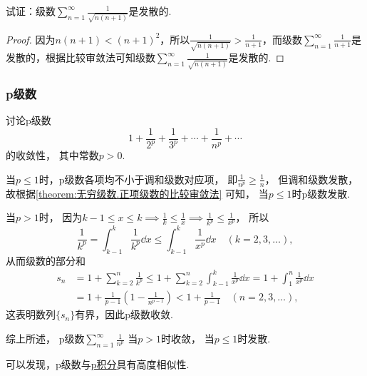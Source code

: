 \begin{example}
试证：级数\(\sum\limits_{n=1}^\infty \frac{1}{\sqrt{n(n+1)}}\)是发散的.
\begin{proof}
因为\(n(n+1) < (n+1)^2\)，所以\(\frac{1}{\sqrt{n(n+1)}} > \frac{1}{n+1}\)，而级数\(\sum\limits_{n=1}^\infty \frac{1}{n+1}\)是发散的，根据比较审敛法可知级数\(\sum\limits_{n=1}^\infty \frac{1}{\sqrt{n(n+1)}}\)是发散的.
\end{proof}
\end{example}

\subsubsection{p级数}
\begin{proposition}\label{example:无穷级数.p级数的收敛性}
讨论p级数\[
	1+\frac{1}{2^p}+\frac{1}{3^p}+\dotsb+\frac{1}{n^p}+\dotsb
\]的收敛性，
其中常数\(p>0\).
\begin{solution}
当\(p \leq 1\)时，p级数各项均不小于调和级数对应项，
即\(\frac{1}{n^p} \geq \frac{1}{n}\)，
但调和级数发散，
故根据\cref{theorem:无穷级数.正项级数的比较审敛法} 可知，
当\(p \leq 1\)时p级数发散.

当\(p > 1\)时，
因为\(k-1
\leq x
\leq k \implies \frac{1}{k}
\leq \frac{1}{x} \implies \frac{1}{k^p}
\leq \frac{1}{x^p}\)，
所以\[
	\frac{1}{k^p}
	= \int_{k-1}^k \frac{1}{k^p} \dd{x}
	\leq \int_{k-1}^k \frac{1}{x^p} \dd{x}
	\quad(k=2,3,\dotsc),
\]
从而级数的部分和
\begin{align*}
	s_n &= 1 + \sum\limits_{k=2}^n{\frac{1}{k^p}}
	\leq 1 + \sum\limits_{k=2}^n{ \int_{k-1}^k{\frac{1}{x^p}\dd{x}} }
	= 1 + \int_1^n{\frac{1}{x^p}\dd{x}} \\
	&= 1 + \frac{1}{p-1}\left(1-\frac{1}{n^{p-1}}\right)
	< 1 + \frac{1}{p-1}
	\quad(n=2,3,\dotsc),
\end{align*}
这表明数列\(\{s_n\}\)有界，因此p级数收敛.

综上所述，{\color{red} p级数\(\sum\limits_{n=1}^\infty \frac{1}{n^p}\)
当\(p > 1\)时收敛，
当\(p \leq 1\)时发散.}
\end{solution}
\end{proposition}
可以发现，p级数与\hyperref[example:定积分.p积分]{p积分}具有高度相似性.

